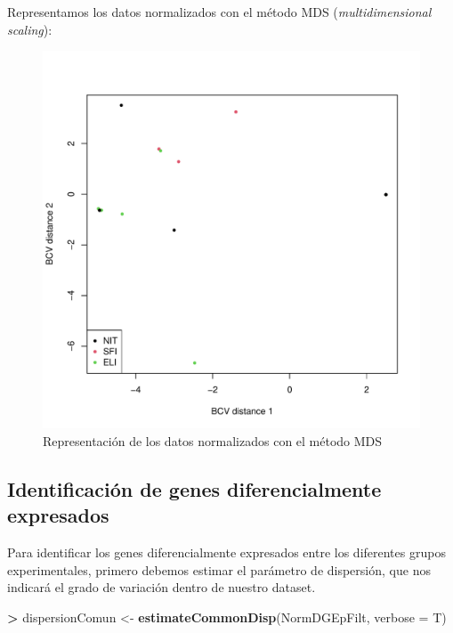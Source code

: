 \documentclass[
  english,
]{article}
\newenvironment{Shaded}{\begin{snugshade}}{\end{snugshade}}
\newcommand{\DataTypeTok}[1]{\textcolor[rgb]{0.13,0.29,0.53}{#1}}
\newcommand{\KeywordTok}[1]{\textcolor[rgb]{0.13,0.29,0.53}{\textbf{#1}}}
\newcommand{\NormalTok}[1]{#1}
\newcommand{\OperatorTok}[1]{\textcolor[rgb]{0.81,0.36,0.00}{\textbf{#1}}}
\newcommand{\StringTok}[1]{\textcolor[rgb]{0.31,0.60,0.02}{#1}}
\begin{document}
Representamos los datos normalizados con el método MDS
(\emph{multidimensional scaling}):

\begin{figure}
\centering
\includegraphics{ortega_rita_ADO_PEC2_files/figure-latex/plot norm_data-1.pdf}
\caption{Representación de los datos normalizados con el método MDS}
\end{figure}

\hypertarget{identificaciuxf3n-de-genes-diferencialmente-expresados}{%
\subsection{Identificación de genes diferencialmente
expresados}\label{identificaciuxf3n-de-genes-diferencialmente-expresados}}

Para identificar los genes diferencialmente expresados entre los
diferentes grupos experimentales, primero debemos estimar el parámetro
de dispersión, que nos indicará el grado de variación dentro de nuestro
dataset.

\begin{Shaded}
\begin{Highlighting}[]
\OperatorTok{>}\StringTok{ }\NormalTok{dispersionComun <-}\StringTok{ }\KeywordTok{estimateCommonDisp}\NormalTok{(NormDGEpFilt, }\DataTypeTok{verbose =}\NormalTok{ T)}
\end{Highlighting}
\end{Shaded}
\end{document}
